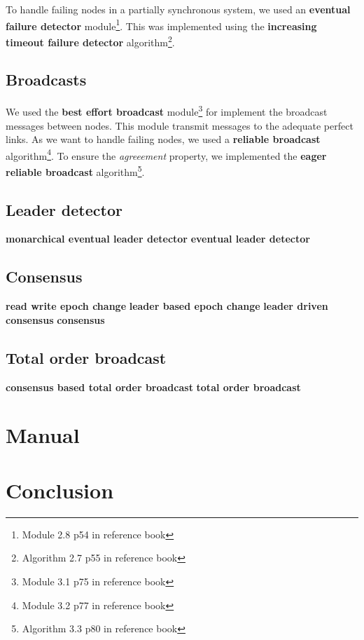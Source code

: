 \documentclass[11pt,english,a4paper]{article}
\begin{document}
To handle failing nodes in a partially synchronous system, we used an \textbf{eventual failure detector} module\footnote{Module 2.8 p54 in reference book}.
This was implemented using the \textbf{increasing timeout failure detector} algorithm\footnote{Algorithm 2.7 p55 in reference book}.

\subsection*{Broadcasts}
We used the \textbf{best effort broadcast} module\footnote{Module 3.1 p75 in reference book} for implement the broadcast messages between nodes.
This module transmit messages to the adequate perfect links.
As we want to handle failing nodes, we used a \textbf{reliable broadcast} algorithm\footnote{Module 3.2 p77 in reference book}.
To ensure the \emph{agreeement} property, we implemented the \textbf{eager reliable broadcast} algorithm\footnote{Algorithm 3.3 p80 in reference book}.


\subsection*{Leader detector}
\textbf{monarchical eventual leader detector}
\textbf{eventual leader detector}

\subsection*{Consensus}
\textbf{read write epoch change}
\textbf{leader based epoch change}
\textbf{leader driven consensus}
\textbf{consensus}

\subsection*{Total order broadcast}
\textbf{consensus based total order broadcast}
\textbf{total order broadcast}

\section{Manual}

\section{Conclusion}
 
\end{document}
